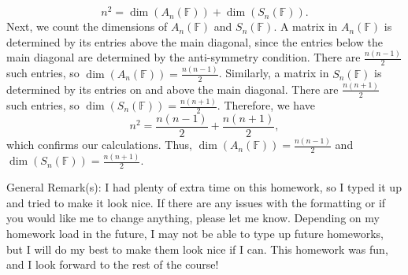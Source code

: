 \documentclass{article}
\begin{document}
\begin{enumerate}[a)]
\begin{enumerate}[i)]
\begin{itemize}
            \[
                n^2 = \dim(A_n(\mathbb{F})) + \dim(S_n(\mathbb{F})).
            \]
            Next, we count the dimensions of $A_n(\mathbb{F})$ and $S_n(\mathbb{F})$. A matrix in $A_n(\mathbb{F})$ is determined by its entries above the main diagonal, since the entries below the main diagonal are determined by the anti-symmetry condition. There are $\frac{n(n-1)}{2}$ such entries, so $\dim(A_n(\mathbb{F})) = \frac{n(n-1)}{2}$. Similarly, a matrix in $S_n(\mathbb{F})$ is determined by its entries on and above the main diagonal. There are $\frac{n(n+1)}{2}$ such entries, so $\dim(S_n(\mathbb{F})) = \frac{n(n+1)}{2}$. Therefore, we have
            \[
                n^2 = \frac{n(n-1)}{2} + \frac{n(n+1)}{2},
            \]
            which confirms our calculations. Thus, $\dim(A_n(\mathbb{F})) = \frac{n(n-1)}{2}$ and $\dim(S_n(\mathbb{F})) = \frac{n(n+1)}{2}$.
        \end{itemize}
        \end{enumerate}
    \end{enumerate}
    General Remark(s): I had plenty of extra time on this homework, so I typed it up and tried to make it look nice. If there are any issues with the formatting or if you would like me to change anything, please let me know. Depending on my homework load in the future, I may not be able to type up future homeworks, but I will do my best to make them look nice if I can. This homework was fun, and I look forward to the rest of the course!
\end{document}

